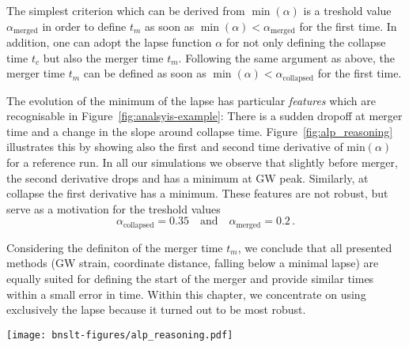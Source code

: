 The simplest criterion which can be derived from $\operatorname{min}(\alpha)$
is a treshold value $\alpha_\textrm{merged}$ in order to define 
$t_m$ as soon as $\operatorname{min}(\alpha) < \alpha_\textrm{merged}$ for the
first time.  
%
%
In addition, one can adopt the lapse function $\alpha$ for not only defining the
collapse time $t_c$ but also the merger time $t_m$. Following the same argument 
as above, the merger time $t_m$ can be defined as soon as
$\operatorname{min}(\alpha) < \alpha_\textrm{collapsed}$ for the first time. 

The evolution of the minimum of the lapse has particular \emph{features}
which are recognisable in Figure~\ref{fig:analsyis-example}: There is a
sudden dropoff at merger time and a change in the slope around collapse time.
Figure~\ref{fig:alp_reasoning} illustrates this by showing also the first and 
second time derivative of min$(\alpha)$ for a reference run. In all our
simulations we observe that slightly before merger, the second derivative
drops and has a minimum at GW peak. Similarly, at collapse the first derivative
has a minimum. These features are not robust, but serve as a motivation for
the treshold values
\begin{equation}\label{eq:arbitrary-alpha-values}
\alpha_\textrm{collapsed} = 0.35
\quad\text{and}\quad
\alpha_\textrm{merged} = 0.2
\,.
\end{equation} 

Considering the definiton of the merger time $t_m$, we conclude that all
presented methods (GW strain, coordinate distance, falling below a minimal
lapse) are equally suited for defining the start of the merger and provide
similar times within a small error in time. Within this chapter, we concentrate
on using exclusively the lapse because it turned out to be most robust.

\begin{marginfigure}
	\hspace*{-.6cm}
	\texttt{[image: bnslt-figures/alp\_reasoning.pdf]}
	\caption[
	Three panels of the evolution of the lapse, with first and second 
	derivative, \exclusive
	]{
		Time evolution in a reference binary system around merger time. The three panels
		show the lapse minimum $\min(\alpha)$, its first and second time
		derivative. The time is measured since merger (defined by GW peak),
		\ie $t_m=0$ in this units.
		The green line indicates merger by $\partial_t^3 \min\alpha=0$.
        The red line indicates collapse by $\partial_t^2 \min\alpha=0$ at 
        $t\sim 3.5$ms.
    }
	\label{fig:alp_reasoning}
\end{marginfigure}

